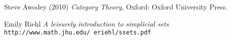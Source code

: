 \documentclass[12pt,a4paper]{book}
\theoremstyle{definition}
\theoremstyle{plain}
\theoremstyle{definition}
\theoremstyle{remark}
\begin{document}
\begin{thebibliography}{9}

Steve Awodey (2010)
\textit{Category Theory},
Oxford: Oxford University Press.

Emily Riehl
\textit{A leisurely introduction to simplicial sets}
\\\texttt{http://www.math.jhu.edu/~eriehl/ssets.pdf}
\end{thebibliography}
\end{document}
